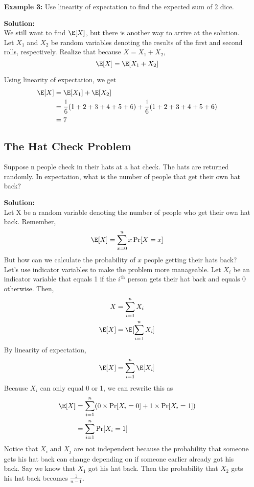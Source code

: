 \vspace{5mm}

\textbf{Example 3:}
Use linearity of expectation to find the expected sum of 2 dice.

\vspace{2.5mm}

\textbf{Solution:} \\
We still want to find $\E[X]$, but there is another way to arrive at the solution. Let $X_{1}$ and $X_{2}$ be random variables denoting the results of the first and second rolls, respectively. Realize that because $X = X_{1} + X_{2}$,
    $$
    \E[X] = \E[X_{1} + X_{2}]
    $$
    
Using linearity of expectation, we get
    \begin{align*}
        \E[X] &= \E[X_{1}] + \E[X_{2}] \\
        &= \frac{1}{6}(1 + 2 + 3 + 4 + 5 + 6) + \frac{1}{6} (1 + 2 + 3 + 4 + 5 + 6) \\
        &= 7
    \end{align*}
    
\subsection*{The Hat Check Problem}
Suppose n people check in their hats at a hat check. The hats are returned randomly. In expectation, what is the number of people that get their own hat back?

\vspace{2.5mm}

\textbf{Solution:} \\
Let X be a random variable denoting the number of people who get their own hat back. Remember,
    $$
    \E[X] = \sum_{x=0}^{n}x\Pr[X = x]
    $$
But how can we calculate the probability of $x$ people getting their hats back? Let’s use indicator variables to make the problem more manageable. Let $X_{i}$ be an indicator variable that equals 1 if the $i^{\text{th}}$ person gets their hat back and equals 0 otherwise. Then,
    \begin{align*}
        X &= \sum_{i=1}^{n}X_{i} \\
        \E[X] &= \E[\sum_{i=1}^{n}X_{i}]
    \end{align*}
By linearity of expectation,
    $$
    \E[X] = \sum_{i=1}^{n}\E[X_{i}]
    $$
Because $X_{i}$ can only equal 0 or 1, we can rewrite this as
    \begin{align*}
        \E[X] &= \sum_{i=1}^{n}(0 \times \Pr[X_{i} = 0] + 1 \times \Pr[X_{i} = 1]) \\
        &= \sum_{i=1}^{n}\Pr[X_{i} = 1]
    \end{align*}
Notice that $X_{i}$ and $X_{j}$ are not independent because the probability that someone gets his hat back can change depending on if someone earlier already got his back. Say we know that $X_{1}$ got his hat back. Then the probability that $X_{2}$ gets his hat back becomes $\frac{1}{n-1}$.

